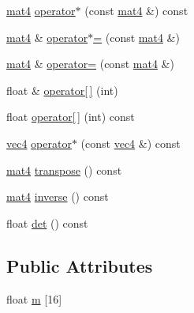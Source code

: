 \begin{DoxyCompactItemize}
\hyperlink{structmat4}{mat4} \hyperlink{structmat4_a7cabd070852d9ccb840b20a6e4e492c2}{operator$\ast$} (const \hyperlink{structmat4}{mat4} \&) const 
\item 
\hyperlink{structmat4}{mat4} \& \hyperlink{structmat4_a480d75ddc6c5b4cd52f96eb9bde7966a}{operator$\ast$=} (const \hyperlink{structmat4}{mat4} \&)
\item 
\hyperlink{structmat4}{mat4} \& \hyperlink{structmat4_a22fc670708db72d05fc55bf02ad9bdcf}{operator=} (const \hyperlink{structmat4}{mat4} \&)
\item 
float \& \hyperlink{structmat4_ad4b21a373faeca027b94e0dce7f215ed}{operator\mbox{[}$\,$\mbox{]}} (int)
\item 
float \hyperlink{structmat4_a6fc70cc7bcabfc7127aef3a2a5cffaaa}{operator\mbox{[}$\,$\mbox{]}} (int) const 
\item 
\hyperlink{structvec4}{vec4} \hyperlink{structmat4_a74d5aa4c7f0bb9b4061551fbb06c120e}{operator$\ast$} (const \hyperlink{structvec4}{vec4} \&) const 
\item 
\hyperlink{structmat4}{mat4} \hyperlink{structmat4_aab816366c2233c95eac70b2eab11e8e2}{transpose} () const 
\item 
\hyperlink{structmat4}{mat4} \hyperlink{structmat4_a90efa7f6bcd321d1433629c8e6c09af3}{inverse} () const 
\item 
float \hyperlink{structmat4_a80b3a218af52e2cdcc5a216bfaa064b7}{det} () const 
\end{DoxyCompactItemize}
\subsection*{Public Attributes}
\begin{DoxyCompactItemize}
\item 
float \hyperlink{structmat4_ab424bc8677a83f16bd30f4eaaecb6d3a}{m} \mbox{[}16\mbox{]}
\end{DoxyCompactItemize}


